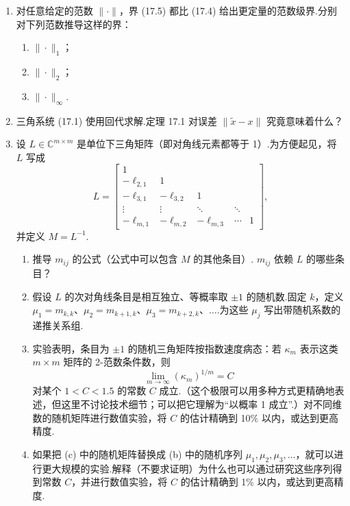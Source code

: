 \documentclass[UTF8,fontset=none,12pt]{ctexart}
\newcommand{\C}{\mathbb{C}}
\theoremstyle{definition}
\begin{document}
\begin{enumerate}[label=\textbf{17.\arabic*}]
    \item 对任意给定的范数 $\|\cdot\|$，界 (17.5) 都比 (17.4) 给出更定量的范数级界.分别对下列范数推导这样的界：
    \begin{enumerate}[label=(\alph*)]
        \item $\|\cdot\|_1$；
        \item $\|\cdot\|_2$；
        \item $\|\cdot\|_\infty$.
    \end{enumerate}

    \item 三角系统 (17.1) 使用回代求解.定理 17.1 对误差 $\|\widetilde x-x\|$ 究竟意味着什么？

    \item 设 $L\in\C^{m\times m}$ 是单位下三角矩阵（即对角线元素都等于 1）.为方便起见，将 $L$ 写成
    \[
    L=\begin{bmatrix}
    1&&&&\\
    -\ell_{2,1}&1&&&\\
    -\ell_{3,1}&-\ell_{3,2}&1&&\\
    \vdots&\vdots&\ddots&\ddots&\\
    -\ell_{m,1}&-\ell_{m,2}&-\ell_{m,3}&\cdots&1
    \end{bmatrix},
    \]
    并定义 $M=L^{-1}$.
    \begin{enumerate}[label=(\alph*)]
        \item 推导 $m_{ij}$ 的公式（公式中可以包含 $M$ 的其他条目）. $m_{ij}$ 依赖 $L$ 的哪些条目？
        \item 假设 $L$ 的次对角线条目是相互独立、等概率取 $\pm1$ 的随机数.固定 $k$，定义 $\mu_1=m_{k,k}$、$\mu_2=m_{k+1,k}$、$\mu_3=m_{k+2,k}$、$\ldots$.为这些 $\mu_j$ 写出带随机系数的递推关系组.
        \item 实验表明，条目为 $\pm1$ 的随机三角矩阵按指数速度病态：若 $\kappa_m$ 表示这类 $m\times m$ 矩阵的 2-范数条件数，则
        \[
        \lim_{m\to\infty}(\kappa_m)^{1/m}=C
        \]
        对某个 $1<C<1.5$ 的常数 $C$ 成立.（这个极限可以用多种方式更精确地表述，但这里不讨论技术细节；可以把它理解为“以概率 1 成立”.）对不同维数的随机矩阵进行数值实验，将 $C$ 的估计精确到 10\% 以内，或达到更高精度.
        \item 如果把 (c) 中的随机矩阵替换成 (b) 中的随机序列 $\mu_1,\mu_2,\mu_3,\ldots$，就可以进行更大规模的实验.解释（不要求证明）为什么也可以通过研究这些序列得到常数 $C$，并进行数值实验，将 $C$ 的估计精确到 1\% 以内，或达到更高精度.
    \end{enumerate}
\end{enumerate}
\end{document}
